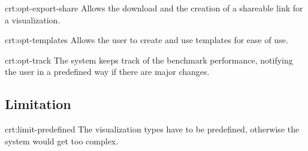 {crt:opt-export-share}
{Allows the download and the creation of a shareable link for a \gls{visualization}.}

{crt:opt-templates}
{Allows the \gls{user} to create and use \glspl{template} for ease of use.}

{crt:opt-track}
{The system keeps track of the benchmark performance, notifying the \gls{user} in a predefined way if there are major changes.}


\subsection{Limitation}

{crt:limit-predefined}
{The \gls{visualization} types have to be predefined, otherwise the system would get too complex.}
